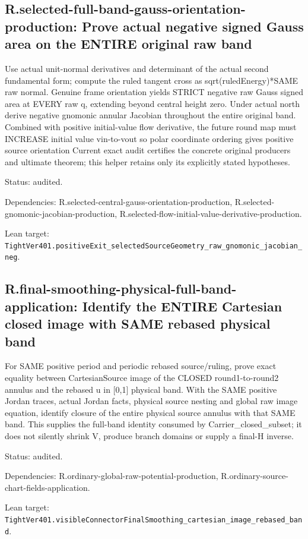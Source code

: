 \documentclass{article}
\begin{document}
\subsection*{R.selected-full-band-gauss-orientation-production: Prove actual negative signed Gauss area on the ENTIRE original raw band}
Use actual unit-normal derivatives and determinant of the actual second fundamental form; compute the ruled tangent cross as sqrt(ruledEnergy)*SAME raw normal. Genuine frame orientation yields STRICT negative raw Gauss signed area at EVERY raw q, extending beyond central height zero. Under actual north derive negative gnomonic annular Jacobian throughout the entire original band. Combined with positive initial-value flow derivative, the future round map must INCREASE initial value vin-to-vout so polar coordinate ordering gives positive source orientation Current exact audit certifies the concrete original producers and ultimate theorem; this helper retains only its explicitly stated hypotheses.
\par Status: audited.
\par Dependencies: R.selected-central-gauss-orientation-production, R.selected-gnomonic-jacobian-production, R.selected-flow-initial-value-derivative-production.
\par Lean target: \texttt{TightVer401.positiveExit\_selectedSourceGeometry\_raw\_gnomonic\_jacobian\_neg}.
\subsection*{R.final-smoothing-physical-full-band-application: Identify the ENTIRE Cartesian closed image with SAME rebased physical band}
For SAME positive period and periodic rebased source/ruling, prove exact equality between CartesianSource image of the CLOSED round1-to-round2 annulus and the rebased u in [0,1] physical band. With the SAME positive Jordan traces, actual Jordan facts, physical source nesting and global raw image equation, identify closure of the entire physical source annulus with that SAME band. This supplies the full-band identity consumed by Carrier\_closed\_subset; it does not silently shrink V, produce branch domains or supply a final-H inverse.
\par Status: audited.
\par Dependencies: R.ordinary-global-raw-potential-production, R.ordinary-source-chart-fields-application.
\par Lean target: \texttt{TightVer401.visibleConnectorFinalSmoothing\_cartesian\_image\_rebased\_band}.
\end{document}
